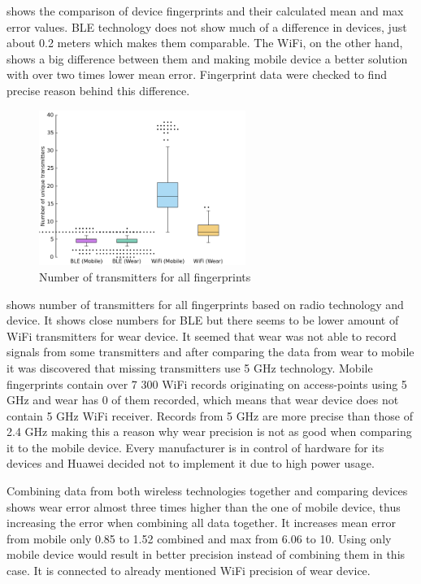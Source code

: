  shows the comparison of device fingerprints and their calculated mean and max error values. BLE technology does not show much of a difference in devices, just about 0.2 meters which makes them comparable. The WiFi, on the other hand, shows a big difference between them and making mobile device a better solution with over two times lower mean error. Fingerprint data were checked to find precise reason behind this difference.

\begin{figure}[h!]
	\begin{centering}
		\includegraphics[width=0.6\textwidth]{img/number_of_transmitters}
		\par\end{centering}
	\caption{Number of transmitters for all fingerprints}
	\label{fig05c06}
\end{figure}

 shows number of transmitters for all fingerprints based on radio technology and device. It shows close numbers for BLE but there seems to be lower amount of WiFi transmitters for wear device. It seemed that wear was not able to record signals from some transmitters and after comparing the data from wear to mobile it was discovered that missing transmitters use 5 GHz technology. Mobile fingerprints contain over 7 300 WiFi records originating on access-points using 5 GHz and wear has 0 of them recorded, which means that wear device does not contain 5 GHz WiFi receiver. Records from 5 GHz are more precise than those of 2.4 GHz making this a reason why wear precision is not as good when comparing it to the mobile device. Every manufacturer is in control of hardware for its devices and Huawei decided not to implement it due to high power usage.

Combining data from both wireless technologies together and comparing devices shows wear error almost three times higher than the one of mobile device, thus increasing the error when combining all data together. It increases mean error from mobile only 0.85 to 1.52 combined and max from 6.06 to 10. Using only mobile device would result in better precision instead of combining them in this case. It is connected to already mentioned WiFi precision of wear device.

